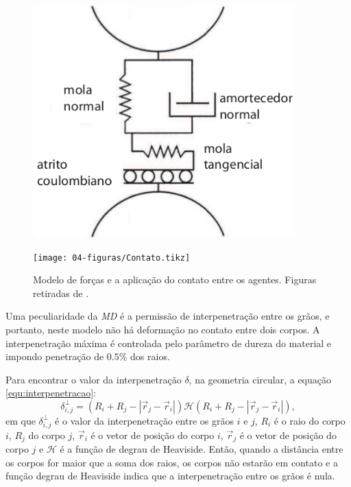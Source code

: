 \begin{figure}
    \begin{minipage}{.45\linewidth}
        \centering
        \includegraphics[width=0.9\textwidth]{04-figuras/Modelo_Forcas.png}
        \label{fig:forcas_modelo}
    \end{minipage}
    \begin{minipage}{.45\linewidth}
        \centering
        \texttt{[image: 04-figuras/Contato.tikz]}
        \label{fig:forcas_contato}
    \end{minipage}
    \caption{Modelo de forças e a aplicação do contato entre os agentes. Figuras retiradas de \cite{Dissertacao}.}
    \label{fig:forcas}
\end{figure}

    Uma peculiaridade da \textit{MD} é a permissão de interpenetração entre os grãos, e portanto, neste modelo não há deformação no contato entre dois corpos. A interpenetração máxima é controlada pelo parâmetro de dureza do material e impondo penetração de $0.5\%$ dos raios.

    Para encontrar o valor da interpenetração $\delta$, na geometria circular, a equação \ref{equ:interpenetracao}:
\begin{equation}
    \label{equ:interpenetracao}
    \delta_{i,j}^{\perp} = \left(R_{i}+R_{j}-\left|\vec{r}_{j}-\vec{r}_{i}\right|\right)\mathcal{H}(R_{i}+R_{j}-\left|\vec{r}_{j}-\vec{r}_{i}\right|),
\end{equation}
em que $\delta_{i,j}^{\perp}$ é o valor da interpenetração entre os grãos $i$ e $j$, $R_{i}$ é o raio do corpo $i$, $R_{j}$ do corpo $j$, $\vec{r}_{i}$ é o vetor de posição do corpo $i$, $\vec{r}_{j}$ é o vetor de posição do corpo $j$ e $\mathcal{H}$ é a função de degrau de Heaviside. Então, quando a distância entre os corpos for maior que a soma dos raios, os corpos não estarão em contato e a função degrau de Heaviside indica que a interpenetração entre os grãos é nula.

